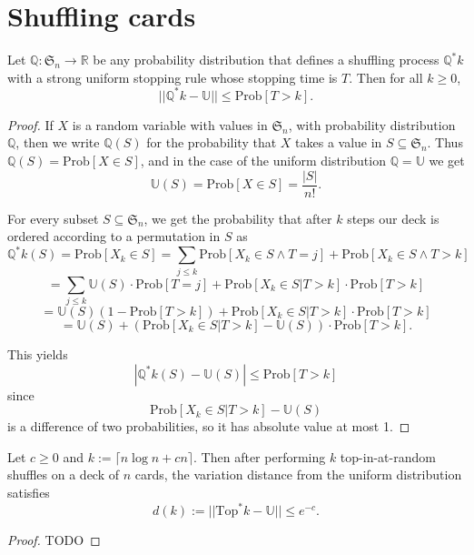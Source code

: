 \chapter{Shuffling cards}
\begin{lemma}
  \label{ch31lemma}
Let $\mathbb{Q} : \mathfrak{S}_n \longrightarrow \mathbb{R}$ be any probability distribution
that defines a shuffling process $\mathbb{Q}^*k$ with a strong uniform stopping rule
whose stopping time is $T$. Then for all $k \geq 0$,
\[
||\mathbb{Q}^*k - \mathbb{U}|| \leq \text{Prob}[T > k].
\]
\end{lemma}
\begin{proof}
If $X$ is a random variable with values in $\mathfrak{S}_n$, with probability distribution $\mathbb{Q}$, then we write $\mathbb{Q}(S)$ for the probability that $X$ takes a value in $S \subseteq \mathfrak{S}_n$. Thus $\mathbb{Q}(S) = \text{Prob}[X \in S]$, and in the case of the uniform distribution $\mathbb{Q} = \mathbb{U}$ we get
\[
\mathbb{U}(S) = \text{Prob}[X \in S] = \frac{|S|}{n!}.
\]

For every subset $S \subseteq \mathfrak{S}_n$, we get the probability that after $k$ steps our deck is ordered according to a permutation in $S$ as
\[
\mathbb{Q}^*k(S) = \text{Prob}[X_k \in S]
= \sum_{j \leq k} \text{Prob}[X_k \in S \land T = j] + \text{Prob}[X_k \in S \land T > k]
\]
\[
= \sum_{j \leq k} \mathbb{U}(S) \cdot \text{Prob}[T = j] + \text{Prob}[X_k \in S | T > k] \cdot \text{Prob}[T > k]
\]
\[
= \mathbb{U}(S) (1 - \text{Prob}[T > k]) + \text{Prob}[X_k \in S | T > k] \cdot \text{Prob}[T > k]
\]
\[
= \mathbb{U}(S) + (\text{Prob}[X_k \in S | T > k] - \mathbb{U}(S)) \cdot \text{Prob}[T > k].
\]

This yields
\[
|\mathbb{Q}^*k(S) - \mathbb{U}(S)| \leq \text{Prob}[T > k]
\]
since
\[
\text{Prob}[X_k \in S | T > k] - \mathbb{U}(S)
\]
is a difference of two probabilities, so it has absolute value at most 1.
\end{proof}


\begin{theorem}
  \label{ch31theorem1}
   Let $c \geq 0$ and $k := \lceil n \log n + cn \rceil$.
   Then after performing $k$ top-in-at-random shuffles on a deck of $n$ cards,
   the variation distance from the uniform distribution satisfies
  \[
  d(k) := ||\text{Top}^*k - \mathbb{U}|| \leq e^{-c}.
  \]
\end{theorem}
\begin{proof}
  TODO
\end{proof}


